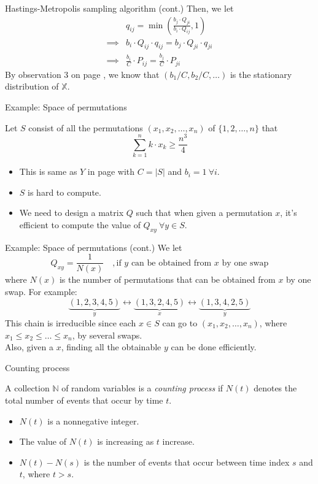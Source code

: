 \documentclass[mathserif]{beamer}
\begin{document}
\begin{frame}{Hastings-Metropolis sampling algorithm (cont.)}
Then, we let
\begin{align*}
& q_{ij} = \min\left( \frac{b_j\cdot Q_{ji}}{b_i\cdot Q_{ij}}, 1 \right) \\
\implies & b_i\cdot Q_{ij}\cdot q_{ij} = b_j\cdot Q_{ji}\cdot q_{ji} \\
\implies & \frac{b_i}{C}\cdot P_{ij} = \frac{b_j}{C}\cdot P_{ji}
\end{align*}
By observation 3 on page \pageref{obs3}, we know that $(b_1/C, b_2/C,\ldots)$ is the stationary distribution of $\mathbb{X}$.
\end{frame}

\begin{frame}{Example: Space of permutations}
\begin{example}
Let $S$ consist of all the permutations $(x_1, x_2, \ldots, x_n)$ of $\{1,2,\ldots,n\}$ that
\[
\sum_{k=1}^n k\cdot x_k \geq \frac{n^3}{4}
\]
\end{example}
\begin{itemize}
\item This is same as $Y$ in page \pageref{possible_Y} with $C=|S|$ and $b_i = 1 ~\forall i$.
\item $S$ is hard to compute.
\item We need to design a matrix $Q$ such that when given a permutation $x$, it's efficient to compute the value of $Q_{xy} ~\forall y\in S$.
\end{itemize}
\end{frame}

\begin{frame}{Example: Space of permutations (cont.)}
We let
\[
Q_{xy} = \frac{1}{N(x)} \quad,\text{if $y$ can be obtained from $x$ by one swap}
\]
where $N(x)$ is the number of permutations that can be obtained from $x$ by one swap.
For example:
\[
\underbrace{(1,2,3,4,5)}_y \leftrightarrow 
\underbrace{(1,3,2,4,5)}_x \leftrightarrow 
\underbrace{(1,3,4,2,5)}_y
\]
This chain is irreducible since each $x\in S$ can go to $(x_1,x_2,\ldots,x_n)$, where $x_1 \leq x_2 \leq \ldots \leq x_n$, by several swaps.\\
Also, given a $x$, finding all the obtainable $y$ can be done efficiently.
\end{frame}

\begin{frame}{Counting process}
\begin{definition}
A collection $\mathbb{N}$ of random variables is a \emph{counting process} if $N(t)$ denotes the total number of events that occur by time $t$.
\end{definition}
\begin{itemize}
\item $N(t)$ is a nonnegative integer.
\item The value of $N(t)$ is increasing as $t$ increase.
\item $N(t) - N(s)$ is the number of events that occur between time index $s$ and $t$, where $t > s$.
\end{itemize}
\end{frame}
\end{document}
